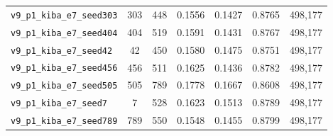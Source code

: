 \begin{table}[!h]
\begin{tabular}{p{4.8cm}cccccc}
\texttt{v9\_\allowbreak{}p1\_\allowbreak{}kiba\_\allowbreak{}e7\_\allowbreak{}seed303} & 303 & 448 & 0.1556 & 0.1427 & 0.8765 & 498,177 \\
\texttt{v9\_\allowbreak{}p1\_\allowbreak{}kiba\_\allowbreak{}e7\_\allowbreak{}seed404} & 404 & 519 & 0.1591 & 0.1431 & 0.8767 & 498,177 \\
\texttt{v9\_\allowbreak{}p1\_\allowbreak{}kiba\_\allowbreak{}e7\_\allowbreak{}seed42} & 42 & 450 & 0.1580 & 0.1475 & 0.8751 & 498,177 \\
\texttt{v9\_\allowbreak{}p1\_\allowbreak{}kiba\_\allowbreak{}e7\_\allowbreak{}seed456} & 456 & 511 & 0.1625 & 0.1436 & 0.8782 & 498,177 \\
\texttt{v9\_\allowbreak{}p1\_\allowbreak{}kiba\_\allowbreak{}e7\_\allowbreak{}seed505} & 505 & 789 & 0.1778 & 0.1667 & 0.8608 & 498,177 \\
\texttt{v9\_\allowbreak{}p1\_\allowbreak{}kiba\_\allowbreak{}e7\_\allowbreak{}seed7} & 7 & 528 & 0.1623 & 0.1513 & 0.8789 & 498,177 \\
\texttt{v9\_\allowbreak{}p1\_\allowbreak{}kiba\_\allowbreak{}e7\_\allowbreak{}seed789} & 789 & 550 & 0.1548 & 0.1455 & 0.8799 & 498,177 \\
\bottomrule
\end{tabular}
\end{table}

